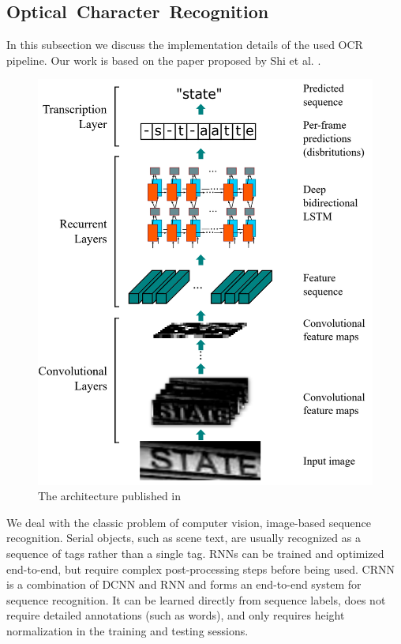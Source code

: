 \subsection{Optical~Character~Recognition}
\label{subsec:ocr}

In this subsection we discuss the implementation details of the used \ac{OCR} pipeline.
Our work is based on the paper proposed by Shi et al. \cite{7801919}.
\begin{figure}
	\includegraphics[width=\textwidth]{figures/crnn.png}
	\caption{The architecture published in \cite{7801919}}
	\label{fig:ocr_architecture}
\end{figure}

We deal with the classic problem of computer vision, image-based sequence
recognition. Serial objects, such as scene text, are usually recognized as
a sequence of tags rather than a single tag. RNNs can be trained and optimized
end-to-end, but require complex post-processing steps before being used. CRNN is
a combination of DCNN and RNN and forms an end-to-end system for sequence
recognition. It can be learned directly from sequence labels, does not require
detailed annotations (such as words), and only requires height normalization in
the training and testing sessions.

